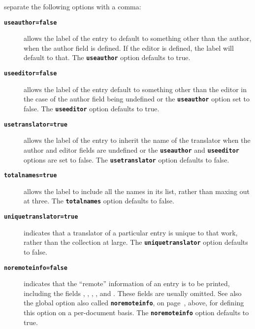 \documentclass{ltxdockit}[2011/03/25]
\makeatletter
\newcommand*{\mycode}[1]{\texttt{\textbf{#1}}}%
\newenvironment*{optionslist}
  {\list{}{%
     \setlength{\labelwidth}{\marglistwidth}%
     \setlength{\labelsep}{\marglistsep}%
     \setlength{\leftmargin}{0pt}%
     \renewcommand*{\makelabel}[1]{\hss\marglistfont##1}}%
   \def\optionitem##1{%
     \item[{##1}]%
     \ltd@pdfbookmark{##1}{##1}}}
  {\endlist}
\makeatother
\begin{document}
\begin{optionslist}
	\optionitem{options}
	separate the following options with a comma:
	\begin{description}
		\item[\mycode{useauthor=false}] allows the label of the entry to default to something other than the author, when the author field is defined. If the editor is defined, the label will default to that. The \mycode{useauthor} option defaults to true.
		\item[\mycode{useeditor=false}] allows the label of the entry default to something other than the editor in the case of the author field being undefined or the \mycode{useauthor} option set to false. The \mycode{useeditor} option defaults to true.
		\item[\mycode{usetranslator=true}] allows the label of the entry to inherit the name of the translator when the author and editor fields are undefined or the \mycode{useauthor} and \mycode{useeditor} options are set to false. The \mycode{usetranslator} option defaults to false.
		\item[\mycode{totalnames=true}] allows the label to include all the names in its list, rather than maxing out at three. The \mycode{totalnames} option defaults to false.
		\item[\mycode{uniquetranslator=true}] indicates that a translator of a particular  entry is unique to that work, rather than the collection at large. The \mycode{uniquetranslator} option defaults to false.
		\item[\mycode{noremoteinfo=false}] indicates that the ``remote'' information of an entry is to be printed, including the fields , , , , and . These fields are usually omitted. See also the global option also called \mycode{noremoteinfo}, on page~\pageref{mla:internal:noremoteinfo}, above, for defining this option on a per-document basis. The \mycode{noremoteinfo} option defaults to true.
	\end{description}	
\end{optionslist}
\end{document}
